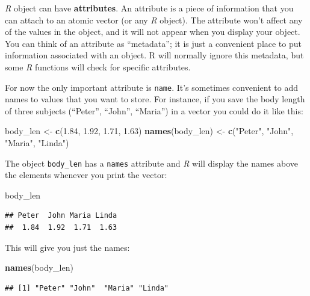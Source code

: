 \documentclass[
]{scrartcl}
\newenvironment{Shaded}{\begin{snugshade}}{\end{snugshade}}
\newcommand{\FloatTok}[1]{\textcolor[rgb]{0.00,0.00,0.81}{#1}}
\newcommand{\KeywordTok}[1]{\textcolor[rgb]{0.13,0.29,0.53}{\textbf{#1}}}
\newcommand{\NormalTok}[1]{#1}
\newcommand{\StringTok}[1]{\textcolor[rgb]{0.31,0.60,0.02}{#1}}
\begin{document}
\emph{R} object can have \textbf{attributes}. An attribute is a piece of information that you can attach to an atomic vector (or any \emph{R} object). The attribute won't affect any of the values in the object, and it will not appear when you display your object. You can think of an attribute as ``metadata''; it is just a convenient place to put information associated with an object. R will normally ignore this metadata, but some \emph{R} functions will check for specific attributes.

For now the only important attribute is \texttt{name}. It's sometimes convenient to add names to values that you want to store. For instance, if you save the body length of three subjects (``Peter'', ``John'', ``Maria'') in a vector you could do it like this:

\begin{Shaded}
\begin{Highlighting}[]
\NormalTok{body\_len \textless{}{-}}\StringTok{ }\KeywordTok{c}\NormalTok{(}\FloatTok{1.84}\NormalTok{, }\FloatTok{1.92}\NormalTok{, }\FloatTok{1.71}\NormalTok{, }\FloatTok{1.63}\NormalTok{)}
\KeywordTok{names}\NormalTok{(body\_len) \textless{}{-}}\StringTok{ }\KeywordTok{c}\NormalTok{(}\StringTok{"Peter"}\NormalTok{, }\StringTok{"John"}\NormalTok{, }\StringTok{"Maria"}\NormalTok{, }\StringTok{"Linda"}\NormalTok{)}
\end{Highlighting}
\end{Shaded}

The object \texttt{body\_len} has a \texttt{names} attribute and \emph{R} will display the names above the elements whenever you print the vector:

\begin{Shaded}
\begin{Highlighting}[]
\NormalTok{body\_len}
\end{Highlighting}
\end{Shaded}

\begin{verbatim}
## Peter  John Maria Linda 
##  1.84  1.92  1.71  1.63
\end{verbatim}

This will give you just the names:

\begin{Shaded}
\begin{Highlighting}[]
\KeywordTok{names}\NormalTok{(body\_len)}
\end{Highlighting}
\end{Shaded}

\begin{verbatim}
## [1] "Peter" "John"  "Maria" "Linda"
\end{verbatim}
\end{document}
